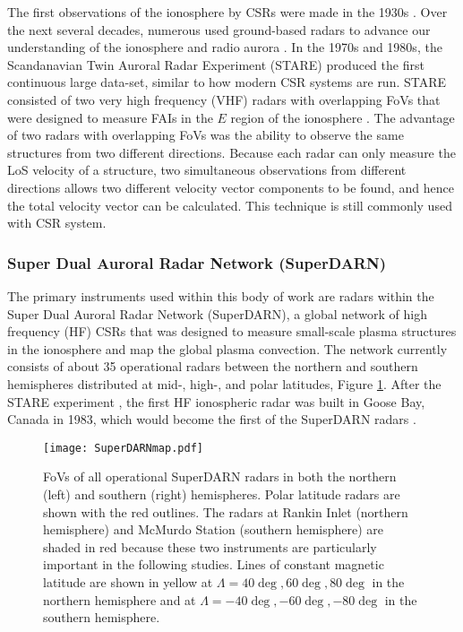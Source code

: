 The first observations of the ionosphere by CSRs were made in the 1930s \citep{Eckersley1937,Harang1938}.  Over the next several decades, numerous used ground-based radars to advance our understanding of the ionosphere and radio aurora \citep{Hultqvist1964,Leadabrand1965,Unwin1972,Sahr1996}.  In the 1970s and 1980s, the Scandanavian Twin Auroral Radar Experiment (STARE) produced the first continuous large data-set, similar to how modern CSR systems are run.  STARE consisted of two very high frequency (VHF) radars with overlapping FoVs that were designed to measure FAIs in the \(E\) region of the ionosphere \citep{Greenwald1997}.  The advantage of two radars with overlapping FoVs was the ability to observe the same structures from two different directions.  Because each radar can only measure the LoS velocity of a structure, two simultaneous observations from different directions allows two different velocity vector components to be found, and hence the total velocity vector can be calculated.  This technique is still commonly used with CSR system.

\subsubsection{Super Dual Auroral Radar Network (SuperDARN)}
\label{sec:superdarn}
The primary instruments used within this body of work are radars within the Super Dual Auroral Radar Network (SuperDARN), a global network of high frequency (HF) CSRs that was designed to measure small-scale plasma structures in the ionosphere and map the global plasma convection.  The network currently consists of about 35 operational radars between the northern and southern hemispheres distributed at mid-, high-, and polar latitudes, Figure \ref{fig:superdarnmap}.  After the STARE experiment \citep{Greenwald1978}, the first HF ionospheric radar was built in Goose Bay, Canada in 1983, which would become the first of the SuperDARN radars \citep{Greenwald1985}.  

\begin{figure}
	\texttt{[image: SuperDARNmap.pdf]}
	\caption[SuperDARN map]{FoVs of all operational SuperDARN radars in both the northern (left) and southern (right) hemispheres.  Polar latitude radars are shown with the red outlines.  The radars at Rankin Inlet (northern hemisphere) and McMurdo Station (southern hemisphere) are shaded in red because these two instruments are particularly important in the following studies.  Lines of constant magnetic latitude are shown in yellow at \(\Lambda = 40\deg, 60\deg, 80\deg\) in the northern hemisphere and at \(\Lambda = -40\deg,-60\deg,-80\deg\) in the southern hemisphere.}
	\label{fig:superdarnmap}
\end{figure}

